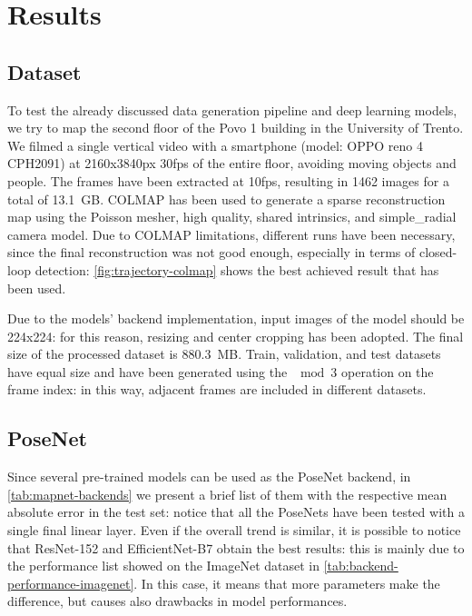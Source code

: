 \section{Results}

\subsection{Dataset}
To test the already discussed data generation pipeline and deep learning models, we try to map the second floor of the Povo 1 building in the University of Trento.
We filmed a single vertical video with a smartphone (model: OPPO reno 4 CPH2091) at 2160x3840px 30fps of the entire floor, avoiding moving objects and people. The frames have been extracted at 10fps, resulting in 1462 images for a total of 13.1 GB. COLMAP has been used to generate a sparse reconstruction map using the Poisson mesher, high quality, shared intrinsics, and simple\_radial camera model.
Due to COLMAP limitations, different runs have been necessary, since the final reconstruction was not good enough, especially in terms of closed-loop detection: \cref{fig:trajectory-colmap} shows the best achieved result that has been used.

Due to the models' backend implementation, input images of the model should be 224x224: for this reason, resizing and center cropping has been adopted. The final size of the processed dataset is 880.3 MB. Train, validation, and test datasets have equal size and have been generated using the $\mod{3}$ operation on the frame index: in this way, adjacent frames are included in different datasets.

\subsection{PoseNet}
Since several pre-trained models can be used as the PoseNet backend, in \cref{tab:mapnet-backends} we present a brief list of them with the respective mean absolute error in the test set: notice that all the PoseNets have been tested with a single final linear layer. Even if the overall trend is similar, it is possible to notice that ResNet-152 and EfficientNet-B7 obtain the best results: this is mainly due to the performance list showed on the ImageNet dataset in \cref{tab:backend-performance-imagenet}. In this case, it means that more parameters make the difference, but causes also drawbacks in model performances.

